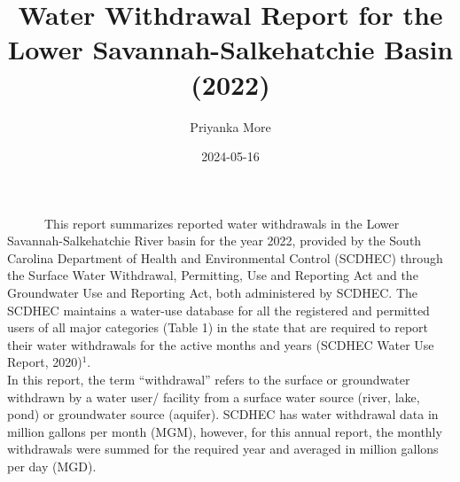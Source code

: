 \documentclass[
]{article}
\title{Water Withdrawal Report for the Lower Savannah-Salkehatchie Basin
(2022)}
\author{Priyanka More}
\date{2024-05-16}
\begin{document}
\maketitle

~~~~~~This report summarizes reported water withdrawals in the Lower
Savannah-Salkehatchie River basin for the year 2022, provided by the
South Carolina Department of Health and Environmental Control (SCDHEC)
through the Surface Water Withdrawal, Permitting, Use and Reporting Act
and the Groundwater Use and Reporting Act, both administered by SCDHEC.
The SCDHEC maintains a water-use database for all the registered and
permitted users of all major categories (Table 1) in the state that are
required to report their water withdrawals for the active months and
years (SCDHEC Water Use Report, 2020)\(^1\).\\
\hspace*{0.333em}\hspace*{0.333em}\hspace*{0.333em}\hspace*{0.333em}\hspace*{0.333em}\hspace*{0.333em}In
this report, the term ``withdrawal'' refers to the surface or
groundwater withdrawn by a water user/ facility from a surface water
source (river, lake, pond) or groundwater source (aquifer). SCDHEC has
water withdrawal data in million gallons per month (MGM), however, for
this annual report, the monthly withdrawals were summed for the required
year and averaged in million gallons per day (MGD).
\end{document}
